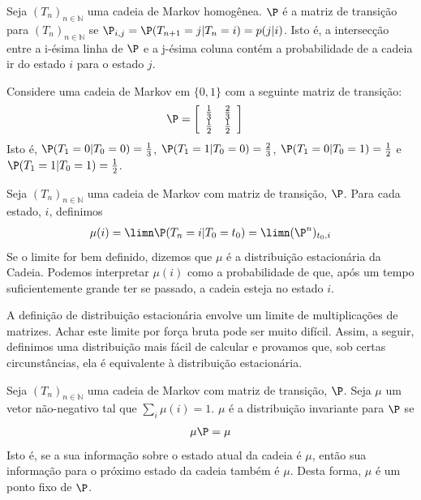 \begin{definition}
 \label{defn:transition}
 Seja $(T_{n})_{n \in \mathbb{N}}$ uma
 cadeia de Markov homogênea. 
 $\P$ é a matriz de transição para
 $(T_{n})_{n \in \mathbb{N}}$ se 
 $\P_{i,j} = \P(T_{n+1}=j|T_{n}=i) = p(j|i)$. 
 Isto é, a intersecção entre a i-ésima linha de
 $\P$ e a j-ésima coluna contém a probabilidade de
 a cadeia ir do estado $i$ para o estado $j$. 
\end{definition}

\begin{example}
 \label{ex:0-1-chain}
 Considere uma cadeia de Markov em $\{0,1\}$ com
 a seguinte matriz de transição:
 \begin{align*}
  \P &= \left[
  \begin{array}{cc}
   \frac{1}{3} & \frac{2}{3} \\
   \frac{1}{2} & \frac{1}{2}
  \end{array} \right ]
 \end{align*}
 Isto é, $\P(T_{1}=0|T_{0}=0) = \frac{1}{3}$,
 $\P(T_{1}=1|T_{0}=0) = \frac{2}{3}$,
 $\P(T_{1}=0|T_{0}=1) = \frac{1}{2}$ e
 $\P(T_{1}=1|T_{0}=1) = \frac{1}{2}$. 
\end{example}
       
\begin{definition}
 Seja $(T_{n})_{n \in \mathbb{N}}$ uma
 cadeia de Markov com matriz de transição, $\P$. 
 Para cada estado, $i$, definimos
 \begin{align*}
  \mu(i) = \limn \P(T_{n} = i|T_{0}=t_{0})
  = \limn (\P^n)_{t_{0},i}
 \end{align*}
 Se o limite for bem definido, dizemos que $\mu$ é a distribuição estacionária da Cadeia.
 Podemos interpretar $\mu(i)$ como a probabilidade de que, 
 após um tempo suficientemente grande ter se passado,
 a cadeia esteja no estado $i$. 
\end{definition}

A definição de distribuição estacionária envolve
um limite de multiplicações de matrizes.
Achar este limite por força bruta pode ser
muito difícil. Assim, a seguir, definimos uma
distribuição mais fácil de calcular e provamos que,
sob certas circunstâncias, ela é equivalente à
distribuição estacionária.

\begin{definition}
 \label{defn:invariant}
 Seja $(T_{n})_{n \in \mathbb{N}}$ uma
 cadeia de Markov com matriz de transição, $\P$. 
 Seja $\mu$ um vetor não-negativo tal que
 $\sum_{i}{\mu(i)} = 1$. 
 $\mu$ é a distribuição invariante para $\P$ se
 \begin{align*}
  \mu \P = \mu 
 \end{align*}
 Isto é, se a sua informação sobre o
 estado atual da cadeia é $\mu$, então sua
 informação para o próximo estado da cadeia
 também é $\mu$. Desta forma,
 $\mu$ é um ponto fixo de $\P$.
\end{definition}

